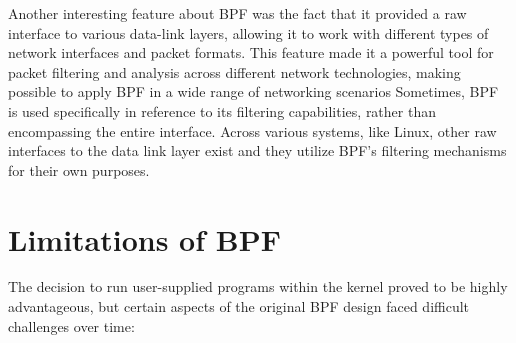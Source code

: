 Another interesting feature about BPF was the fact that it provided a raw interface to various data-link layers, allowing it to work with different types of network interfaces and packet formats.
This feature made it a powerful tool for packet filtering and analysis across different network technologies, making possible to apply BPF in a wide range of networking scenarios
Sometimes, BPF is used specifically in reference to its filtering capabilities, rather than encompassing the entire interface. 
Across various systems, like Linux, other raw interfaces to the data link layer exist and they utilize BPF's filtering mechanisms for their own purposes. 

\section{Limitations of BPF}

The decision to run user-supplied programs within the kernel proved to be highly advantageous, but certain aspects of the original BPF design faced difficult challenges over time:

